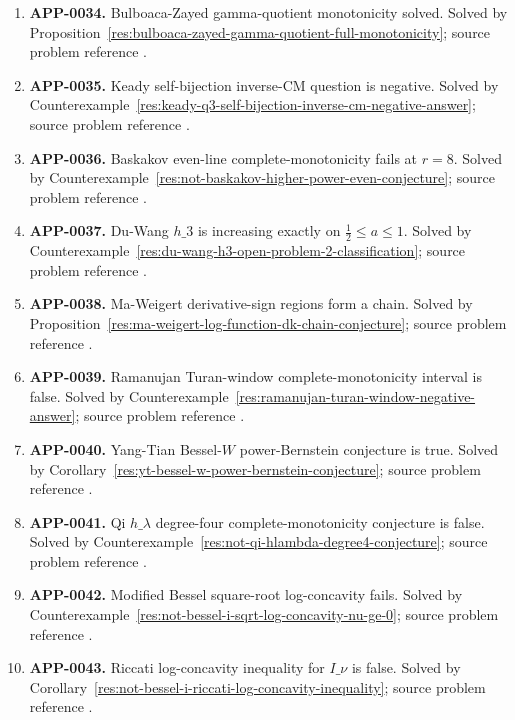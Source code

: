 \documentclass[11pt]{article}
\numberwithin{equation}{section}
\theoremstyle{definition}
\theoremstyle{remark}
\newcommand{\1}{\mathbf 1}
\begin{document}
\begin{enumerate}
\item \label{ledger:app-0034}\textbf{APP-0034.} Bulboaca-Zayed gamma-quotient monotonicity solved. Solved by Proposition~\ref{res:bulboaca-zayed-gamma-quotient-full-monotonicity}; source problem reference \cite{bulboaca-zayed-gamma}.
\item \label{ledger:app-0035}\textbf{APP-0035.} Keady self-bijection inverse-CM question is negative. Solved by Counterexample~\ref{res:keady-q3-self-bijection-inverse-cm-negative-answer}; source problem reference \cite{app-app-0035-source}.
\item \label{ledger:app-0036}\textbf{APP-0036.} Baskakov even-line complete-monotonicity fails at \(r=8\). Solved by Counterexample~\ref{res:not-baskakov-higher-power-even-conjecture}; source problem reference \cite{abel-gawronski-neuschel}.
\item \label{ledger:app-0037}\textbf{APP-0037.} Du-Wang \(h\_3\) is increasing exactly on \(\frac12\le a\le1\). Solved by Counterexample~\ref{res:du-wang-h3-open-problem-2-classification}; source problem reference \cite{du-wang-h3}.
\item \label{ledger:app-0038}\textbf{APP-0038.} Ma-Weigert derivative-sign regions form a chain. Solved by Proposition~\ref{res:ma-weigert-log-function-dk-chain-conjecture}; source problem reference \cite{ma-weigert-log-functions}.
\item \label{ledger:app-0039}\textbf{APP-0039.} Ramanujan Turan-window complete-monotonicity interval is false. Solved by Counterexample~\ref{res:ramanujan-turan-window-negative-answer}; source problem reference \cite{mishra-swaminathan-ramanujan}.
\item \label{ledger:app-0040}\textbf{APP-0040.} Yang-Tian Bessel-\(W\) power-Bernstein conjecture is true. Solved by Corollary~\ref{res:yt-bessel-w-power-bernstein-conjecture}; source problem reference \cite{app-app-0040-source}.
\item \label{ledger:app-0041}\textbf{APP-0041.} Qi \(h\_\lambda\) degree-four complete-monotonicity conjecture is false. Solved by Counterexample~\ref{res:not-qi-hlambda-degree4-conjecture}; source problem reference \cite{app-app-0041-source}.
\item \label{ledger:app-0042}\textbf{APP-0042.} Modified Bessel square-root log-concavity fails. Solved by Counterexample~\ref{res:not-bessel-i-sqrt-log-concavity-nu-ge-0}; source problem reference \cite{app-app-0042-source}.
\item \label{ledger:app-0043}\textbf{APP-0043.} Riccati log-concavity inequality for \(I\_\nu\) is false. Solved by Corollary~\ref{res:not-bessel-i-riccati-log-concavity-inequality}; source problem reference \cite{app-app-0042-source}.

\end{enumerate}
\end{document}

